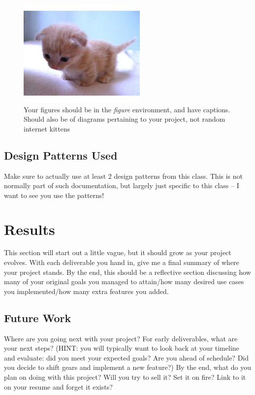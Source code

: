 \documentclass[10pt,conference,onecolumn,compsoc]{IEEEtran}
\begin{document}
\begin{figure}[ht!]
\includegraphics[scale=1.5]{cat2.jpg}
\caption{Your figures should be in the \emph{figure} environment, and have captions.  Should also be of diagrams pertaining to your project, not random internet kittens}
\label{cat2}
\end{figure}


\subsection{Design Patterns Used}
Make sure to actually use at least 2 design patterns from this class.  This is not normally part of such documentation, but largely just specific to this class -- I want to see you use the patterns!


\section{Results}
This section will start out a little vague, but it should grow as your project evolves.  With each deliverable you hand in, give me a final summary of where your project stands.  By the end, this should be a reflective section discussing how many of your original goals you managed to attain/how many desired use cases you implemented/how many extra features you added.

\subsection{Future Work}
Where are you going next with your project?
For early deliverables, what are your next steps?  (HINT: you will typically want to look back at your timeline and evaluate: did you meet your expected goals?  Are you ahead of schedule?  Did you decide to shift gears and implement a new feature?)
By the end, what do you plan on doing with this project?  Will you try to sell it?  Set it on fire?  Link to it on your resume and forget it exists?
\end{document}
